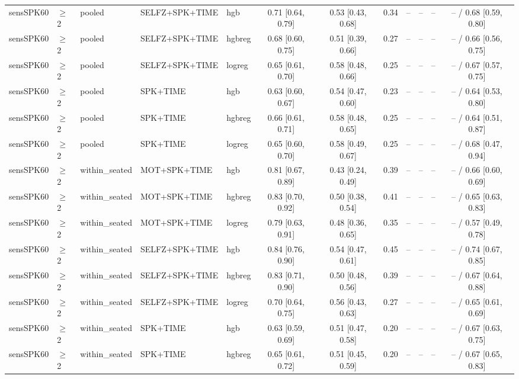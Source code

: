 \begin{longtable}{@{}lllllcccrrrc@{}}
sensSPK60 & $\geq$2 & pooled & SELFZ+SPK+TIME & hgb & 0.71 [0.64, 0.79] & 0.53 [0.43, 0.68] & 0.34 & -- & -- & -- & -- / 0.68 [0.59, 0.80] \\
sensSPK60 & $\geq$2 & pooled & SELFZ+SPK+TIME & hgbreg & 0.68 [0.60, 0.75] & 0.51 [0.39, 0.66] & 0.27 & -- & -- & -- & -- / 0.66 [0.56, 0.75] \\
sensSPK60 & $\geq$2 & pooled & SELFZ+SPK+TIME & logreg & 0.65 [0.61, 0.70] & 0.58 [0.48, 0.66] & 0.25 & -- & -- & -- & -- / 0.67 [0.57, 0.75] \\
sensSPK60 & $\geq$2 & pooled & SPK+TIME & hgb & 0.63 [0.60, 0.67] & 0.54 [0.47, 0.60] & 0.23 & -- & -- & -- & -- / 0.64 [0.53, 0.80] \\
sensSPK60 & $\geq$2 & pooled & SPK+TIME & hgbreg & 0.66 [0.61, 0.71] & 0.58 [0.48, 0.65] & 0.25 & -- & -- & -- & -- / 0.64 [0.51, 0.87] \\
sensSPK60 & $\geq$2 & pooled & SPK+TIME & logreg & 0.65 [0.60, 0.70] & 0.58 [0.49, 0.67] & 0.25 & -- & -- & -- & -- / 0.68 [0.47, 0.94] \\
sensSPK60 & $\geq$2 & within\_seated & MOT+SPK+TIME & hgb & 0.81 [0.67, 0.89] & 0.43 [0.24, 0.49] & 0.39 & -- & -- & -- & -- / 0.66 [0.60, 0.69] \\
sensSPK60 & $\geq$2 & within\_seated & MOT+SPK+TIME & hgbreg & 0.83 [0.70, 0.92] & 0.50 [0.38, 0.54] & 0.41 & -- & -- & -- & -- / 0.65 [0.63, 0.83] \\
sensSPK60 & $\geq$2 & within\_seated & MOT+SPK+TIME & logreg & 0.79 [0.63, 0.91] & 0.48 [0.36, 0.65] & 0.35 & -- & -- & -- & -- / 0.57 [0.49, 0.78] \\
sensSPK60 & $\geq$2 & within\_seated & SELFZ+SPK+TIME & hgb & 0.84 [0.76, 0.90] & 0.54 [0.47, 0.61] & 0.45 & -- & -- & -- & -- / 0.74 [0.67, 0.85] \\
sensSPK60 & $\geq$2 & within\_seated & SELFZ+SPK+TIME & hgbreg & 0.83 [0.71, 0.90] & 0.50 [0.48, 0.56] & 0.39 & -- & -- & -- & -- / 0.67 [0.64, 0.88] \\
sensSPK60 & $\geq$2 & within\_seated & SELFZ+SPK+TIME & logreg & 0.70 [0.64, 0.75] & 0.56 [0.43, 0.63] & 0.27 & -- & -- & -- & -- / 0.65 [0.61, 0.69] \\
sensSPK60 & $\geq$2 & within\_seated & SPK+TIME & hgb & 0.63 [0.59, 0.69] & 0.51 [0.47, 0.58] & 0.20 & -- & -- & -- & -- / 0.67 [0.63, 0.75] \\
sensSPK60 & $\geq$2 & within\_seated & SPK+TIME & hgbreg & 0.65 [0.61, 0.72] & 0.51 [0.45, 0.59] & 0.20 & -- & -- & -- & -- / 0.67 [0.65, 0.83] \\

\end{longtable}
